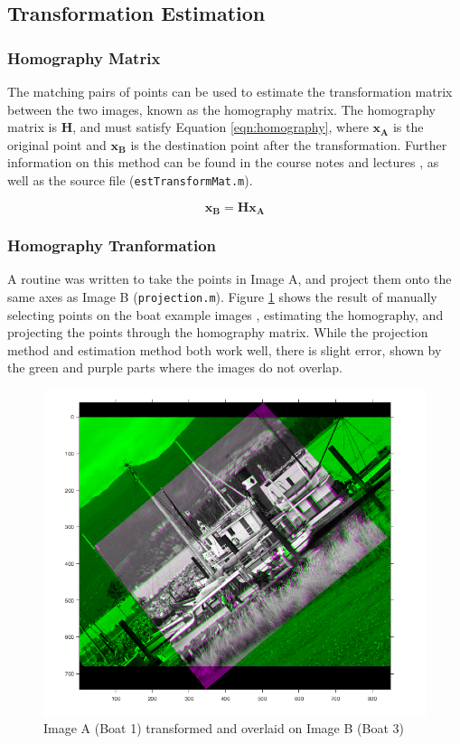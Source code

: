 \documentclass[a4paper, 10pt, conference]{ieeeconf}
\begin{document}
\subsection{Transformation Estimation}

\subsubsection{Homography Matrix}
The matching pairs of points can be used to estimate the transformation matrix between the two images, known as the homography matrix. The homography matrix is \textbf{H}, and must satisfy Equation \ref{eqn:homography}, where $\textbf{x}_\textbf{A}$ is the original point and $\textbf{x}_\textbf{B}$ is the destination point after the transformation. Further information on this method can be found in the course notes and lectures \cite{notes}, as well as the source file (\texttt{estTransformMat.m}).

\vspace{-0.15cm}
\begin{equation} \label{eqn:homography}
    \textbf{x}_\textbf{B} = \textbf{Hx}_\textbf{A}
\end{equation}
\vspace{-0.5cm}

\subsubsection{Homography Tranformation}
A routine was written to take the points in Image A, and project them onto the same axes as Image B (\texttt{projection.m}). Figure \ref{fig:boat13} shows the result of manually selecting points on the boat example images \cite{boat}, estimating the homography, and projecting the points through the homography matrix. While the projection method and estimation method both work well, there is slight error, shown by the green and purple parts where the images do not overlap.

\begin{figure}[!ht]
  \centering
  \includegraphics[width=0.75\linewidth]{pic/q2_1_b4_1_3_pair}
  \caption{Image A (Boat 1) transformed and overlaid on Image B (Boat 3)}
  \label{fig:boat13}
  \vspace{-0.5cm}
\end{figure}
\end{document}
